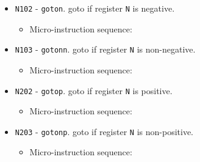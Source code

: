 \documentclass{article}
\def\pkptrout{\Verb|0202| - output *\Verb|pk| to data bus}
\def\datatotmpa{\Verb|2402| - write to \Verb|tmpA| from data bus}
\def\tmpatopkifn{\Verb|0802| - write to \Verb|pk| from \Verb|tmpA| if data bus is negative; increment otherwise}
\def\tmpatopkifnn{\Verb|0902| - write to \Verb|pk| from \Verb|tmpA| if data bus is non-negative; increment otherwise}
\def\tmpatopkifp{\Verb|0a02| - write to \Verb|pk| from \Verb|tmpA| if data bus is positive; increment otherwise}
\def\tmpatopkifnp{\Verb|0b02| - write to \Verb|pk| from \Verb|tmpA| if data bus is non-positive; increment otherwise}
\def\regtodata#1{\Verb|#1003| - output \Verb|r#1| to data bus}
\def\done{\Verb|fffe| - end instruction}
\begin{document}
\begin{itemize}
    \item \Verb|N102| - \Verb|goton|. goto if register \Verb|N| is negative.
    \begin{itemize}
        \item Micro-instruction sequence:
    \end{itemize}

    \item \Verb|N103| - \Verb|gotonn|. goto if register \Verb|N| is non-negative.
    \begin{itemize}
        \item Micro-instruction sequence:
    \end{itemize}

    
    \item \Verb|N202| - \Verb|gotop|. goto if register \Verb|N| is positive.
    \begin{itemize}
        \item Micro-instruction sequence:
    \end{itemize}

    \item \Verb|N203| - \Verb|gotonp|. goto if register \Verb|N| is non-positive.
    \begin{itemize}
        \item Micro-instruction sequence:
    \end{itemize}
\end{itemize}
\end{document}
